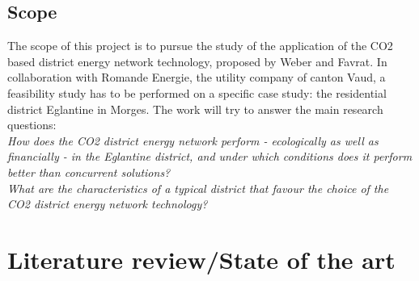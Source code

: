 \documentclass{article}
\begin{document}


\subsection{Scope}
The scope of this project is to pursue the study of the application of the CO2 based district energy network technology, proposed by Weber and Favrat\cite{weberConventionalAdvancedCO22010a}. In collaboration with Romande Energie, the utility company of canton Vaud, a feasibility study has to be performed on a specific case study: the residential district Eglantine in Morges. The work will try to answer the main research questions:\\
\textit{How does the CO2 district energy network perform - ecologically as well as financially - in the Eglantine district, and under which conditions does it perform better than concurrent solutions?}\\

\textit{What are the characteristics of a typical district that favour the choice of the CO2 district energy network technology?}


\section{Literature review/State of the art}
\end{document}

